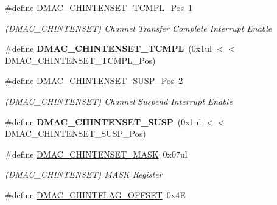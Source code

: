 \begin{DoxyCompactItemize}
\item 
\hypertarget{group___s_a_m_l21___d_m_a_c_gabab06df7bdd28459af4ec4d99a10ab43}{}\#define \hyperlink{group___s_a_m_l21___d_m_a_c_gabab06df7bdd28459af4ec4d99a10ab43}{D\+M\+A\+C\+\_\+\+C\+H\+I\+N\+T\+E\+N\+S\+E\+T\+\_\+\+T\+C\+M\+P\+L\+\_\+\+Pos}~1\label{group___s_a_m_l21___d_m_a_c_gabab06df7bdd28459af4ec4d99a10ab43}

\begin{DoxyCompactList}\small\item\em (D\+M\+A\+C\+\_\+\+C\+H\+I\+N\+T\+E\+N\+S\+E\+T) Channel Transfer Complete Interrupt Enable \end{DoxyCompactList}\item 
\hypertarget{group___s_a_m_l21___d_m_a_c_ga18daf4e86325ab6456187ff72629bc12}{}\#define {\bfseries D\+M\+A\+C\+\_\+\+C\+H\+I\+N\+T\+E\+N\+S\+E\+T\+\_\+\+T\+C\+M\+P\+L}~(0x1ul $<$$<$ D\+M\+A\+C\+\_\+\+C\+H\+I\+N\+T\+E\+N\+S\+E\+T\+\_\+\+T\+C\+M\+P\+L\+\_\+\+Pos)\label{group___s_a_m_l21___d_m_a_c_ga18daf4e86325ab6456187ff72629bc12}

\item 
\hypertarget{group___s_a_m_l21___d_m_a_c_gaf0c8dc48c13c97b310bd2ab02ad8525a}{}\#define \hyperlink{group___s_a_m_l21___d_m_a_c_gaf0c8dc48c13c97b310bd2ab02ad8525a}{D\+M\+A\+C\+\_\+\+C\+H\+I\+N\+T\+E\+N\+S\+E\+T\+\_\+\+S\+U\+S\+P\+\_\+\+Pos}~2\label{group___s_a_m_l21___d_m_a_c_gaf0c8dc48c13c97b310bd2ab02ad8525a}

\begin{DoxyCompactList}\small\item\em (D\+M\+A\+C\+\_\+\+C\+H\+I\+N\+T\+E\+N\+S\+E\+T) Channel Suspend Interrupt Enable \end{DoxyCompactList}\item 
\hypertarget{group___s_a_m_l21___d_m_a_c_ga6e2fdaf5221f2143c22b75e20858f970}{}\#define {\bfseries D\+M\+A\+C\+\_\+\+C\+H\+I\+N\+T\+E\+N\+S\+E\+T\+\_\+\+S\+U\+S\+P}~(0x1ul $<$$<$ D\+M\+A\+C\+\_\+\+C\+H\+I\+N\+T\+E\+N\+S\+E\+T\+\_\+\+S\+U\+S\+P\+\_\+\+Pos)\label{group___s_a_m_l21___d_m_a_c_ga6e2fdaf5221f2143c22b75e20858f970}

\item 
\hypertarget{group___s_a_m_l21___d_m_a_c_gada2a3a81b05257960bf2abe4b337339e}{}\#define \hyperlink{group___s_a_m_l21___d_m_a_c_gada2a3a81b05257960bf2abe4b337339e}{D\+M\+A\+C\+\_\+\+C\+H\+I\+N\+T\+E\+N\+S\+E\+T\+\_\+\+M\+A\+S\+K}~0x07ul\label{group___s_a_m_l21___d_m_a_c_gada2a3a81b05257960bf2abe4b337339e}

\begin{DoxyCompactList}\small\item\em (D\+M\+A\+C\+\_\+\+C\+H\+I\+N\+T\+E\+N\+S\+E\+T) M\+A\+S\+K Register \end{DoxyCompactList}\item 
\hypertarget{group___s_a_m_l21___d_m_a_c_ga214f8ef629a5407cb641fc29c432f501}{}\#define \hyperlink{group___s_a_m_l21___d_m_a_c_ga214f8ef629a5407cb641fc29c432f501}{D\+M\+A\+C\+\_\+\+C\+H\+I\+N\+T\+F\+L\+A\+G\+\_\+\+O\+F\+F\+S\+E\+T}~0x4\+E\label{group___s_a_m_l21___d_m_a_c_ga214f8ef629a5407cb641fc29c432f501}


\end{DoxyCompactItemize}
